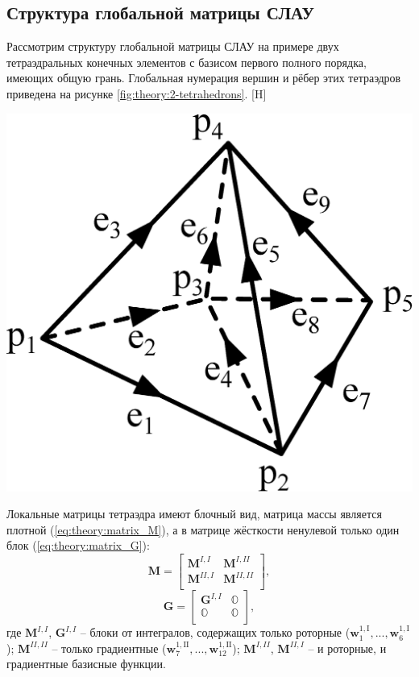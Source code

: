 \documentclass[a4paper,14pt]{article}
\makeatletter
\renewenvironment{figure}[1][\fps@figure]{
  \edef\@tempa{\noexpand\@float{figure}[#1]}
  \@tempa
  \addtocounter{foofigure}{1}
}{
  \end@float
}
\makeatother
\begin{document}
\subsection{Структура глобальной матрицы СЛАУ}
Рассмотрим структуру глобальной матрицы СЛАУ на примере двух тетраэдральных конечных элементов с базисом первого полного порядка, имеющих общую грань. Глобальная нумерация вершин и рёбер этих тетраэдров приведена на рисунке \ref{fig:theory:2-tetrahedrons}.
\begin{figure}[H]
	\centering
	\includegraphics[scale=0.25]{theory/2-tetrahedrons.eps}
	\caption{два тетраэдральных конечных элемента}
	\label{fig:theory:2-tetrahedrons}
\end{figure}

Локальные матрицы тетраэдра имеют блочный вид, матрица массы является плотной (\ref{eq:theory:matrix_M}), а в матрице жёсткости ненулевой только один блок (\ref{eq:theory:matrix_G}):
\begin{equation}
	\mathbf{M} = \left[
	\begin{matrix}
		\mathbf{M}^{I, I} & \mathbf{M}^{I, II} \\
		\mathbf{M}^{II, I} & \mathbf{M}^{II, II} \\
	\end{matrix}
	\right] , \label{eq:theory:matrix_M}
\end{equation}
\begin{equation}
	\mathbf{G} = \left[
	\begin{matrix}
		\mathbf{G}^{I, I} & \mathbb{O} \\
		\mathbb{O} &  \mathbb{O} \\
	\end{matrix}
	\right] , \label{eq:theory:matrix_G}
\end{equation}
где $\mathbf{M}^{I, I}$, $\mathbf{G}^{I, I}$ -- блоки от интегралов, содержащих только роторные ($\mathbf{w}_{1}^{1,\mathrm{I}}, ..., \mathbf{w}_{6}^{1,\mathrm{I}}$); $\mathbf{M}^{II, II}$ -- только градиентные ($\mathbf{w}_{7}^{1,\mathrm{II}}, ..., \mathbf{w}_{12}^{1,\mathrm{II}}$); $\mathbf{M}^{I, II}$, $\mathbf{M}^{II, I}$ -- и роторные, и градиентные базисные функции.
\end{document}
